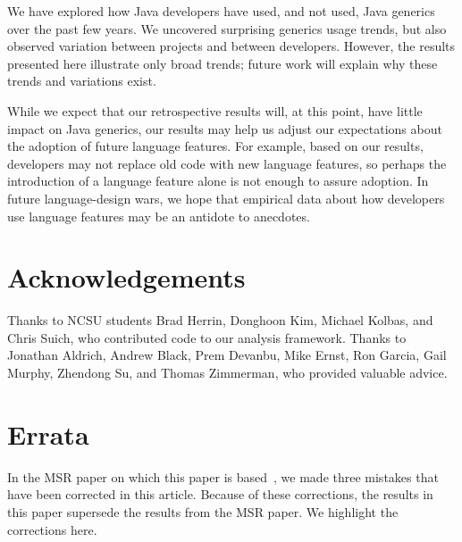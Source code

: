 \documentclass{svjour3}
\newcommand{\todo}[1]{}
\begin{document}
We have explored how Java developers have used, 
and not used, Java generics over the past few years.
We uncovered surprising generics usage trends,
but also observed variation between
projects and between developers.
However, the results presented here illustrate only
broad trends; future work will
explain why these trends and variations exist.

While we expect that our retrospective results will, at this point, have little
impact on Java generics, our results may help us adjust our expectations
about the adoption of future language features.
For example, based on our results, developers may not
replace old code with new language features, so perhaps the introduction
of a language feature alone is not enough to assure adoption.
In future language-design wars, we hope that empirical data about how
developers use language features may be an antidote to anecdotes.


% 
% 



\section*{Acknowledgements}


Thanks to NCSU students Brad Herrin, Donghoon Kim, Michael Kolbas, and Chris Suich,
who contributed code to our analysis framework.
Thanks to Jonathan Aldrich, Andrew Black, Prem Devanbu, Mike Ernst, Ron Garcia, 
Gail Murphy, Zhendong Su, and Thomas Zimmerman, who provided valuable advice.

\section*{Errata}

In the MSR paper on which this paper is based~\cite{parnin11}, 
we made three mistakes that have
been corrected in this article. 
Because of these corrections, the results in this paper
supersede the results from the MSR paper.
We highlight the corrections here.
\end{document}
